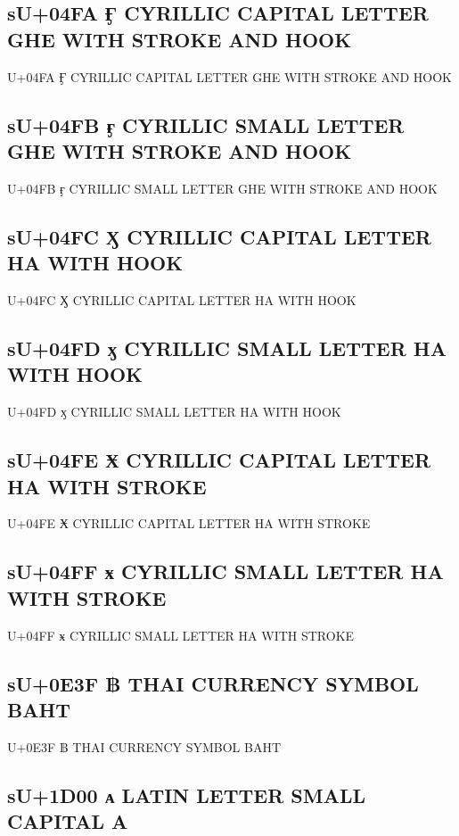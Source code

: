 \subsection{sU+04FA Ӻ  CYRILLIC CAPITAL LETTER GHE WITH STROKE AND HOOK}

U+04FA Ӻ  CYRILLIC CAPITAL LETTER GHE WITH STROKE AND HOOK

\subsection{sU+04FB ӻ  CYRILLIC SMALL LETTER GHE WITH STROKE AND HOOK}

U+04FB ӻ  CYRILLIC SMALL LETTER GHE WITH STROKE AND HOOK

\subsection{sU+04FC Ӽ  CYRILLIC CAPITAL LETTER HA WITH HOOK}

U+04FC Ӽ  CYRILLIC CAPITAL LETTER HA WITH HOOK

\subsection{sU+04FD ӽ  CYRILLIC SMALL LETTER HA WITH HOOK}

U+04FD ӽ  CYRILLIC SMALL LETTER HA WITH HOOK

\subsection{sU+04FE Ӿ  CYRILLIC CAPITAL LETTER HA WITH STROKE}

U+04FE Ӿ  CYRILLIC CAPITAL LETTER HA WITH STROKE

\subsection{sU+04FF ӿ  CYRILLIC SMALL LETTER HA WITH STROKE}

U+04FF ӿ  CYRILLIC SMALL LETTER HA WITH STROKE

\fi

\subsection{sU+0E3F ฿  THAI CURRENCY SYMBOL BAHT}

U+0E3F ฿  THAI CURRENCY SYMBOL BAHT

\subsection{sU+1D00 ᴀ LATIN LETTER SMALL CAPITAL A}


